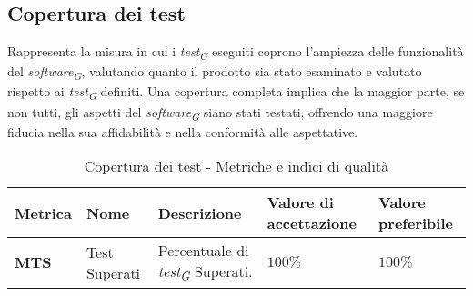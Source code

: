 \subsection{Copertura dei test}
Rappresenta la misura in cui i \textit{test}\textsubscript{\textit{G}} eseguiti coprono l'ampiezza delle funzionalità del \textit{software}\textsubscript{\textit{G}}, valutando quanto il prodotto sia stato esaminato e valutato rispetto ai \textit{test}\textsubscript{\textit{G}} definiti. Una copertura completa implica che la maggior parte, se non tutti, gli aspetti del \textit{software}\textsubscript{\textit{G}} siano stati testati, offrendo una maggiore fiducia nella sua affidabilità e nella conformità alle aspettative.  
\begin{table}[H]
    \centering
    \begin{tabular}{|C{1.5cm}|L{3cm}|L{4cm}|L{2.5cm}|L{2.5cm}|}
        \hline
        \textbf{Metrica} & \textbf{Nome} & \textbf{Descrizione} & \textbf{Valore di accettazione} & \textbf{Valore preferibile} \\
        \hline
        \textbf{MTS} & Test Superati & Percentuale di \textit{test}\textsubscript{\textit{G}} Superati. & $ 100\%$ & $100\%$ \\
        \hline
    \end{tabular}
    \caption{Copertura dei test - Metriche e indici di qualità}
    \label{tab:copertura_qualita_prodotto}
\end{table}